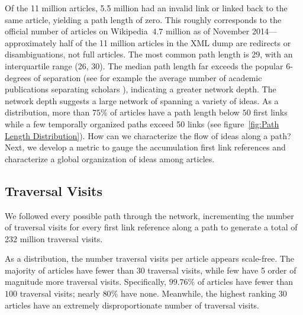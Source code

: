 \documentclass[pre,twocolumn,twoside,superscriptaddress,floatfix, aps, 10pt]{revtex4-1}
\begin{document}
Of the 11 million articles, 5.5 million had an invalid link or linked back to the same article, yielding a path length of zero. 
This roughly corresponds to the official number of articles on Wikipedia 
$~4.7$ million as of November 2014---approximately half of the 11 million 
articles in the XML dump are redirects or disambiguations, not full articles.
The most common path length is 29, with an interquartile range (26, 30).
The median path length far exceeds the popular 6-degrees of separation (see for 
example the average number of academic publications separating scholars 
\cite{six_degrees}), indicating a greater network depth. The network depth suggests a large network of spanning a variety of ideas.
As a distribution, more than $75\%$ of articles have a path length below 
$50$ first links 
while a few temporally organized paths exceed 50 links 
(see figure~\ref{fig:Path Length Distribution}). 
How can we characterize the flow of ideas along a path? Next, we develop 
a metric to gauge the accumulation first link references
and characterize a global organization 
of ideas among articles.




\subsection{Traversal Visits}

We followed every possible path through the network, incrementing
the number of traversal visits for every first link reference along a path 
to generate a total of 232 million traversal visits.

As a distribution, the number traversal visits per article appears scale-free. The majority of articles have fewer than 30 traversal visits, while few 
have 5 order of magnitude more traversal visits. 
Specifically, $99.76\%$ of articles have fewer than $100$ traversal visits; nearly $80\%$ have none. 
Meanwhile, the highest ranking 30 articles have an extremely disproportionate number of traversal visits.
\end{document}
